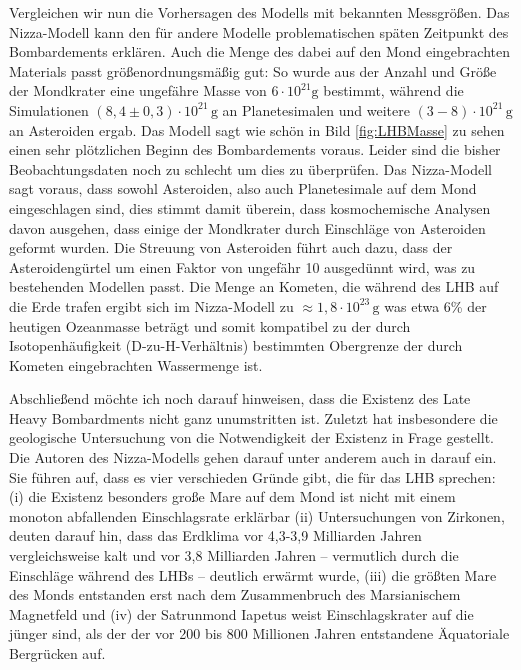 \documentclass[12pt,a4paper,twoside]{article}
\begin{document}
Vergleichen wir nun die Vorhersagen des Modells mit bekannten Messgrößen. Das Nizza-Modell kann den für andere Modelle problematischen späten Zeitpunkt des Bombardements erklären. Auch die Menge des dabei auf den Mond eingebrachten Materials passt größenordnungsmäßig gut: So wurde aus der Anzahl und Größe der Mondkrater eine ungefähre Masse von $6 \cdot 10^{21} \mathrm{g}$ bestimmt, während die Simulationen $\left(8,4 \pm 0,3\right) \cdot 10^{21} \, \mathrm{g}$ an Planetesimalen und weitere $\left( 3-8 \right) \cdot 10^{21} \, \mathrm{g}$ an Asteroiden ergab. %
Das Modell sagt wie schön in Bild \ref{fig:LHBMasse} zu sehen einen sehr plötzlichen Beginn des Bombardements voraus. Leider sind die bisher Beobachtungsdaten noch zu schlecht um dies zu überprüfen.
Das Nizza-Modell sagt voraus, dass sowohl Asteroiden, also auch Planetesimale auf dem Mond eingeschlagen sind, dies stimmt damit überein, dass kosmochemische Analysen davon ausgehen, dass einige der Mondkrater durch Einschläge von Asteroiden geformt wurden.
Die Streuung von Asteroiden führt auch dazu, dass der Asteroidengürtel um einen Faktor von ungefähr 10 ausgedünnt wird, was zu bestehenden Modellen passt.  %
Die Menge an Kometen, die während des LHB auf die Erde trafen ergibt sich im Nizza-Modell zu $\approx 1,8 \cdot 10^{23} \, \mathrm{g}$ was etwa 6\% der heutigen Ozeanmasse beträgt und somit kompatibel zu der durch Isotopenhäufigkeit (D-zu-H-Verhältnis) bestimmten Obergrenze der durch Kometen eingebrachten Wassermenge ist\cite{Morbidelli2000, Gomes2005}.

Abschließend möchte ich noch darauf hinweisen, dass die Existenz des Late Heavy Bombardments nicht ganz unumstritten ist. Zuletzt hat insbesondere die geologische Untersuchung von \cite{Spudis2011} die Notwendigkeit der Existenz in Frage gestellt. Die Autoren des Nizza-Modells gehen darauf unter anderem auch in \cite{Brasser2009} darauf ein. Sie führen auf, dass es vier verschieden Gründe gibt, die für das LHB sprechen: (i) die Existenz besonders große Mare auf dem Mond ist nicht mit einem monoton abfallenden Einschlagsrate erklärbar (ii) Untersuchungen von Zirkonen, deuten darauf hin, dass das Erdklima vor 4,3-3,9 Milliarden Jahren vergleichsweise kalt und vor 3,8 Milliarden Jahren -- vermutlich durch die Einschläge während des LHBs -- deutlich erwärmt wurde, (iii) die größten Mare des Monds entstanden erst nach dem Zusammenbruch des Marsianischem Magnetfeld und (iv) der Satrunmond Iapetus weist Einschlagskrater auf die jünger sind, als der der vor 200 bis 800 Millionen Jahren entstandene Äquatoriale Bergrücken auf. %
\end{document}
